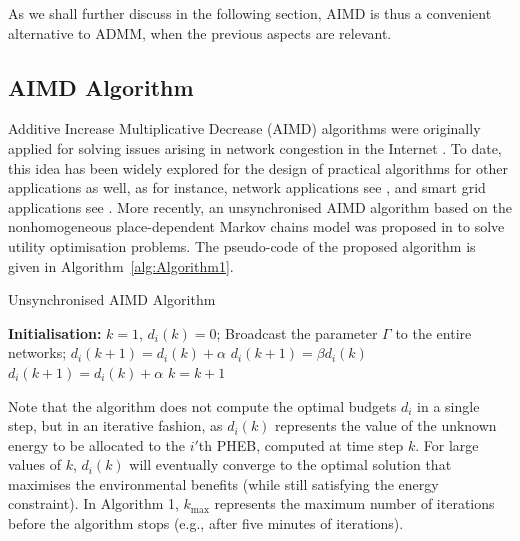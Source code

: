 \documentclass[journal]{IEEEtran}
\begin{document}
As we shall further discuss in the following section, AIMD is thus a convenient alternative to ADMM, when the previous aspects are relevant.

\subsection{AIMD Algorithm}

Additive Increase Multiplicative Decrease (AIMD) algorithms were originally applied for solving issues arising in network congestion in the Internet \cite{rejaie1999rap}. To date, this idea has been widely explored for the design of practical algorithms for other applications as well, as for instance, network applications see \cite{corless2012ergodic, budzisz2009strategy, shorten2005analysis}, and smart grid applications see \cite{liu2013investigation, crisostomi2014plug, studli2014optimal}. More recently, an unsynchronised AIMD algorithm based on the nonhomogeneous place-dependent Markov chains model was proposed in \cite{wirth2014nonhomogeneous} to solve utility optimisation problems. The pseudo-code of the proposed algorithm is given in Algorithm~\ref{alg:Algorithm1}.
\begin{algorithm}[htbp]
	\caption{Unsynchronised AIMD Algorithm}
	\begin{algorithmic}[1]	
		\State \textbf{Initialisation:} $k = 1$, $d_i(k) = 0$; 
		\State Broadcast the parameter $\Gamma$ to the entire networks;
		\State $d_i(k+1) = d_i(k) + \alpha$
		\State $d_i(k+1) = \beta d_i(k)$
		\Else 
		\State $d_i(k+1) = d_i(k) + \alpha$  
		\EndIf 	
		\State $k = k +1$
		\EndWhile
	\end{algorithmic}
	\label{alg:Algorithm1}
\end{algorithm}
Note that the algorithm does not compute the optimal budgets $d_i$ in a single step, but in an iterative fashion, as $d_i(k)$ represents the value of the unknown energy to be allocated to the $i'$th PHEB, computed at time step $k$. For large values of $k$, $d_i(k)$ will eventually converge to the optimal solution that maximises the environmental benefits (while still satisfying the energy constraint). In Algorithm 1, $k_{\textrm{max}}$ represents the maximum number of iterations before the algorithm stops (e.g., after five minutes of iterations).
\end{document}
